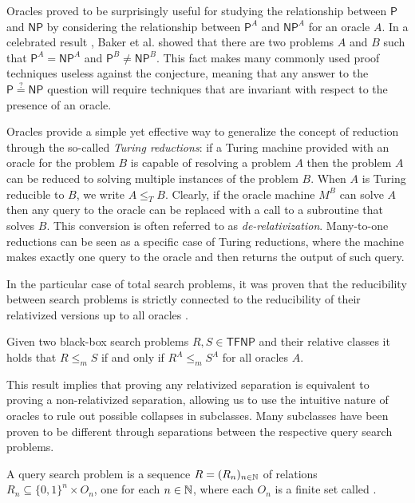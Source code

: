 Oracles proved to be surprisingly useful for studying the relationship between $\mathsf{P}$ and $\mathsf{NP}$ by considering the relationship between $\mathsf{P}^A$ and $\mathsf{NP}^A$ for an oracle $A$. In a celebrated result \cite{relativization_p_np}, Baker et al. showed that there are two problems $A$ and $B$ such that $\mathsf{P}^A = \mathsf{NP}^A$ and $\mathsf{P}^B \neq \mathsf{NP}^B$. This fact makes many commonly used proof techniques useless against the conjecture, meaning that any answer to the $\mathsf{P} \stackrel{?}{=} \mathsf{NP}$ question will require techniques that are invariant with respect to the presence of an oracle.

Oracles provide a simple yet effective way to generalize the concept of reduction through the so-called \textit{Turing reductions}: if a Turing machine provided with an oracle for the problem $B$ is capable of resolving a problem $A$ then the problem $A$ can be reduced to solving multiple instances of the problem $B$. When $A$ is Turing reducible to $B$, we write $A \leq_T B$. Clearly, if the oracle machine $M^B$ can solve $A$ then any query to the oracle can be replaced with a call to a subroutine that solves $B$. This conversion is often referred to as \textit{de-relativization}. Many-to-one reductions can be seen as a specific case of Turing reductions, where the machine makes exactly one query to the oracle and then returns the output of such query.

In the particular case of total search problems, it was proven that the reducibility between search problems is strictly connected to the reducibility of their relativized versions up to all oracles \cite{rel_comp_np_search}.

\begin{theorem}
 Given two black-box search problems $R,S \in \mathsf{TFNP}$ and their relative classes it holds that $R \leq_m S$ if and only if $R^A \leq_m S^A$ for all oracles $A$.
\end{theorem}

This result implies that proving any relativized separation is equivalent to proving a non-relativized separation, allowing us to use the intuitive nature of oracles to rule out possible collapses in \TFNP subclasses. Many \TFNP subclasses have been proven to be different through separations between the respective query search problems. \cite{proofs_circuits_communication, tfnp_characterization}

\begin{definition}
 A query search problem is a sequence $R = (R_n)_{n \in \mathbb{N}}$ of relations $R_n \subseteq \{0,1\}^n \times O_n$, one for each $n \in \mathbb{N}$, where each $O_n$ is a finite set called .
\end{definition}

